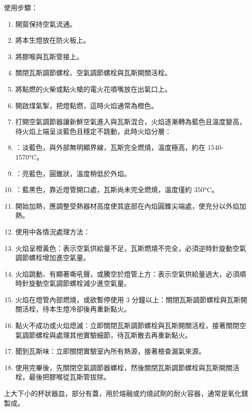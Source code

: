 \documentclass[a4paper,12pt]{article}
\begin{document}
\begin{itemize}
使用步驟：
\begin{enumerate}
\item 開窗保持空氣流通。
\item 將本生燈放在防火板上。
\item 將膠喉與瓦斯管接上。
\item 關閉瓦斯調節螺栓、空氣調節螺栓與瓦斯開關活栓。
\item 將點燃的火柴或點火槍的電火花噴嘴放在出氣口上。
\item 開啟煤氣掣，把燈點燃，這時火焰通常為橙色。
\item 打開空氣調節器讓新鮮空氣進入與瓦斯混合，火焰逐漸轉為藍色且溫度變高，待火焰上端呈淡藍色且穩定不跳動，此時火焰分層：
\bit
\item {}：淡藍色，與外部無明顯界線，瓦斯完全燃燒，溫度極高，約在 1540-1570°C。
\item {}：亮藍色，圓錐狀，溫度稍低於外焰。
\item {}：藍黑色，靠近燈管開口處，瓦斯尚未完全燃燒，溫度僅約 350°C。
\eit
\item 開始加熱，應調整受熱器材高度使其底部在內焰圓錐尖端處，使充分以外焰加熱。
\item 使用中各情況處理方法：
\bit
\item 火焰呈橙黃色：表示空氣供給量不足，瓦斯燃燒不完全，必須逆時針旋動空氣調節螺栓增加進空氣量。
\item 火焰跳動、有顯著嘶吼聲，或騰空於燈管上方：表示空氣供給量過大，必須順時針旋動空氣調節螺栓減少進空氣量。
\item 火焰在燈管內部燃燒，或欲暫停使用 3 分鐘以上：關閉瓦斯調節螺栓與瓦斯開關活栓，待本生燈冷卻後再重新點火。
\item 點火不成功或火焰熄滅：立即關閉瓦斯調節螺栓與瓦斯開關活栓，接著關閉空氣調節螺栓與處理其他實驗細節，待瓦斯散去再重新點火。
\item 聞到瓦斯味：立即關閉實驗室內所有熱源，接著檢查漏氣來源。
\eit
\item 使用完畢後，先關閉空氣調節器螺栓，然後關閉瓦斯調節螺栓與瓦斯開關活栓，最後把膠喉從瓦斯管拔除。
\end{enumerate}
上大下小的杯狀器皿，部分有蓋，用於熔融或灼燒試劑的耐火容器，通常是氧化鎂製成。


\end{itemize}
\end{document}
